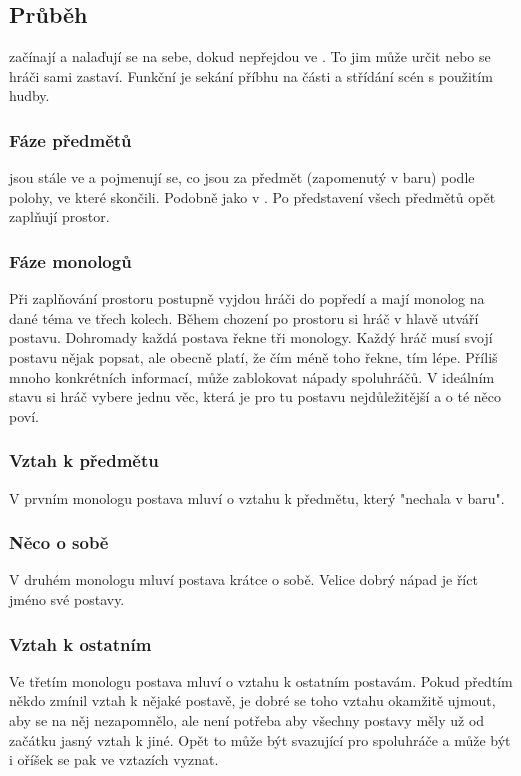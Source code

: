\documentclass[main.tex]{subfiles}
\begin{document}
\subsection{ Průběh }  začínají  a nalaďují se na sebe, dokud nepřejdou ve . To jim může určit  nebo se hráči sami zastaví.  
Funkční je sekání příbhu na části a střídání scén s použitím hudby. 
 
\subsubsection{ Fáze předmětů }  jsou stále ve  a pojmenují se, co jsou za předmět (zapomenutý v baru) podle polohy, ve které skončili. Podobně jako v . Po představení všech předmětů opět zaplňují prostor. 
 
\subsubsection{ Fáze monologů } Při zaplňování prostoru postupně vyjdou hráči do popředí a mají monolog na dané téma ve třech kolech. Během chození po prostoru si hráč v hlavě utváří postavu. Dohromady každá postava řekne tři monology. Každý hráč musí svojí postavu nějak popsat, ale obecně platí, že čím méně toho řekne, tím lépe. Příliš mnoho konkrétních informací, může zablokovat nápady spoluhráčů. V ideálním stavu si hráč vybere jednu věc, která je pro tu postavu nejdůležitější a o té něco poví. 
 
\subsubsection{ Vztah k předmětu } V prvním monologu postava mluví o vztahu k předmětu, který "nechala v baru".  
 
\subsubsection{ Něco o sobě } V druhém monologu mluví postava krátce o sobě. Velice dobrý nápad je říct jméno své postavy. 
 
\subsubsection{ Vztah k ostatním } Ve třetím monologu postava mluví o vztahu k ostatním postavám. Pokud předtím někdo zmínil vztah k nějaké postavě, je dobré se toho vztahu okamžitě ujmout, aby se na něj nezapomnělo, ale není potřeba aby všechny postavy měly už od začátku jasný vztah k jiné. Opět to může být svazující pro spoluhráče a může být i oříšek se pak ve vztazích vyznat. 
 
\end{document}
